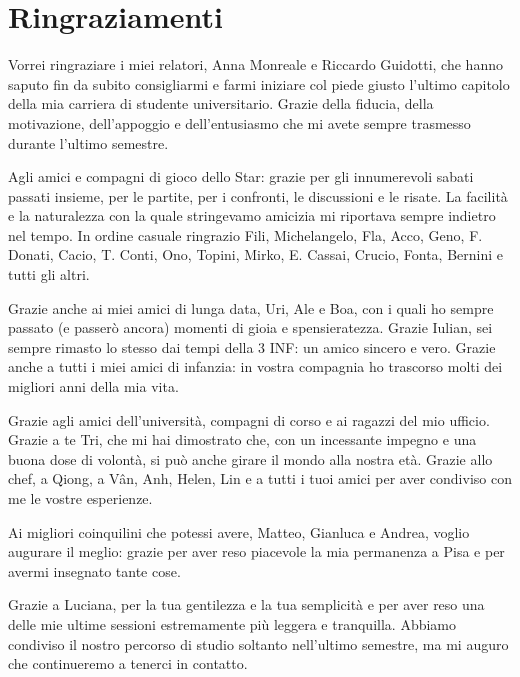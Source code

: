 \documentclass[12pt, twoside, a4paper]{report}
\newcommand{\whitepage}{\clearpage
						\thispagestyle{empty}
						\phantom{a}
						\vfill}
\begin{document}


\whitepage

\sloppy
\nocite{*}

\newpage

\chapter*{Ringraziamenti}

\thispagestyle{empty}
\footnotesize

Vorrei ringraziare i miei relatori, Anna Monreale e Riccardo Guidotti, che hanno saputo fin da subito consigliarmi e farmi iniziare col piede giusto l'ultimo capitolo della mia carriera di studente universitario. Grazie della fiducia, della motivazione, dell'appoggio e dell'entusiasmo che mi avete sempre trasmesso durante l'ultimo semestre.

Agli amici e compagni di gioco dello Star: grazie per gli innumerevoli sabati passati insieme, per le partite, per i confronti, le discussioni e le risate. La facilità e la naturalezza con la quale stringevamo amicizia mi riportava sempre indietro nel tempo. In ordine casuale ringrazio Fili, Michelangelo, Fla, Acco, Geno, F. Donati, Cacio, T. Conti, Ono, Topini, Mirko, E. Cassai, Crucio, Fonta, Bernini e tutti gli altri. 

Grazie anche ai miei amici di lunga data, Uri, Ale e Boa, con i quali ho sempre passato (e passerò ancora) momenti di gioia e spensieratezza. Grazie Iulian, sei sempre rimasto lo stesso dai tempi della 3 INF: un amico sincero e vero.
Grazie anche a tutti i miei amici di infanzia: in vostra compagnia ho trascorso molti dei migliori anni della mia vita.

Grazie agli amici dell'università, compagni di corso e ai ragazzi del mio ufficio. 
Grazie a te Tri, che mi hai dimostrato che, con un incessante impegno e una buona dose di volontà, si può anche girare il mondo alla nostra età. Grazie allo chef, a Qiong, a Vân, Anh, Helen, Lin e a tutti i tuoi amici per aver condiviso con me le vostre esperienze.

Ai migliori coinquilini che potessi avere, Matteo, Gianluca e Andrea, voglio augurare il meglio: grazie per aver reso piacevole la mia permanenza a Pisa e per avermi insegnato tante cose.

Grazie a Luciana, per la tua gentilezza e la tua semplicità e per aver reso una delle mie ultime sessioni estremamente più leggera e tranquilla. Abbiamo condiviso il nostro percorso di studio soltanto nell'ultimo semestre, ma mi auguro che continueremo a tenerci in contatto. 
\end{document}
